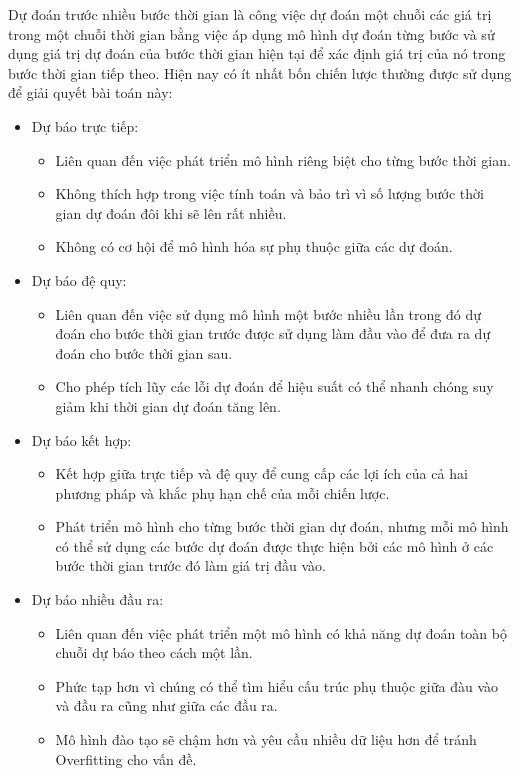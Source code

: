 Dự đoán trước nhiều bước thời gian là công việc dự đoán một chuỗi các giá trị trong một chuỗi thời gian bằng việc áp dụng mô hình dự đoán từng bước và sử dụng giá trị dự đoán của bước thời gian hiện tại để xác định giá trị của nó trong bước thời gian tiếp theo. Hiện nay có ít nhất bốn chiến lược thường được sử dụng để giải quyết bài toán này:
\begin{itemize}
    \item Dự báo trực tiếp:
    \begin{itemize}
        \item Liên quan đến việc phát triển mô hình riêng biệt cho từng bước thời gian.
        \item Không thích hợp trong việc tính toán và bảo trì vì số lượng bước thời gian dự đoán đôi khi sẽ lên rất nhiều.
        \item Không có cơ hội để mô hình hóa sự phụ thuộc giữa các dự đoán.
    \end{itemize}
    \item Dự báo đệ quy:
    \begin{itemize}
        \item Liên quan đến việc sử dụng mô hình một bước nhiều lần trong đó dự đoán cho bước thời gian trước được sử dụng làm đầu vào để đưa ra dự đoán cho bước thời gian sau.
        \item Cho phép tích lũy các lỗi dự đoán để hiệu suất có thể nhanh chóng suy giảm khi thời gian dự đoán tăng lên.
    \end{itemize}
    \item Dự báo kết hợp:
    \begin{itemize}
        \item Kết hợp giữa trực tiếp và đệ quy để cung cấp các lợi ích của cả hai phương pháp và khắc phụ hạn chế của mỗi chiến lược.
        \item Phát triển mô hình cho từng bước thời gian dự đoán, nhưng mỗi mô hình có thể sử dụng các bước dự đoán được thực hiện bởi các mô hình ở các bước thời gian trước đó làm giá trị đầu vào.
    \end{itemize}
    \item Dự báo nhiều đầu ra:
    \begin{itemize}
        \item Liên quan đến việc phát triển một mô hình có khả năng dự đoán toàn bộ chuỗi dự báo theo cách một lần.
        \item Phức tạp hơn vì chúng có thể tìm hiểu cấu trúc phụ thuộc giữa đàu vào và đầu ra cũng như giữa các đầu ra.
        \item Mô hình đào tạo sẽ chậm hơn và yêu cầu nhiều dữ liệu hơn để tránh Overfitting cho vấn đề.
    \end{itemize}
\end{itemize}

